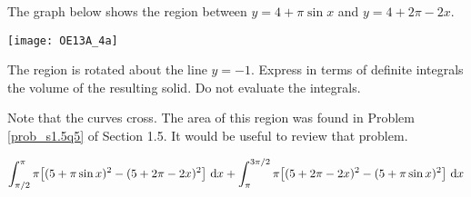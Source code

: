 \begin{question}[2013A]
The graph below shows the region between
$y = 4 + \pi \sin x$ and $y = 4 + 2\pi - 2x$.

\begin{center}
       \texttt{[image: OE13A\_4a]}
\end{center}

\noindent The region is rotated about the line $y = -1$.
Express in terms of definite integrals the volume of the resulting
solid. Do not evaluate the integrals.
\end{question}

\begin{hint}
Note that the curves cross. The area of this
region was found in Problem \ref{prob_s1.5q5} of Section 1.5.
It would be useful to review that problem.
\end{hint}

\begin{answer}
$\displaystyle\int_{\pi/2}^\pi \pi\big[(5 + \pi \sin x)^2-(5 + 2\pi - 2x)^2\big]\ \mathrm{d}x
   +\displaystyle\int^{3\pi/2}_\pi \pi\big[(5 + 2\pi - 2x)^2-(5 + \pi \sin x)^2\big]\
            \mathrm{d}x$
\end{answer}

